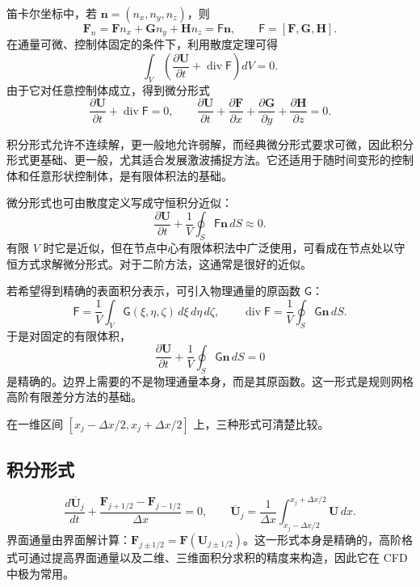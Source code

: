 \documentclass[11pt,a4paper,openany,fontset=none]{ctexbook}
\begin{document}
笛卡尔坐标中，若 $\bm n=(n_x,n_y,n_z)$，则
\begin{equation}
 \bm F_n=\bm F n_x+\bm G n_y+\bm H n_z=\boldsymbol{\mathsf F}\bm n,
 \qquad \boldsymbol{\mathsf F}=[\bm F,\bm G,\bm H]. \tag{1.14.2--3}
\end{equation}
在通量可微、控制体固定的条件下，利用散度定理可得
\begin{equation}
 \int_V\left(\frac{\partial\bm U}{\partial t}+\operatorname{div}\boldsymbol{\mathsf F}\right)dV=0.
\end{equation}
由于它对任意控制体成立，得到微分形式
\begin{equation}
 \frac{\partial\bm U}{\partial t}+\operatorname{div}\boldsymbol{\mathsf F}=0,\qquad
 \frac{\partial\bm U}{\partial t}+\frac{\partial\bm F}{\partial x}
 +\frac{\partial\bm G}{\partial y}+\frac{\partial\bm H}{\partial z}=0. \tag{1.14.6--7}
\end{equation}

积分形式允许不连续解，更一般地允许弱解，而经典微分形式要求可微，因此积分形式更基础、更一般，尤其适合发展激波捕捉方法。它还适用于随时间变形的控制体和任意形状控制体，是有限体积法的基础。

微分形式也可由散度定义写成守恒积分近似：
\begin{equation}
 \frac{\partial\bm U}{\partial t}+\frac1V\oint_S\boldsymbol{\mathsf F}\bm n\,dS\approx0. \tag{1.14.9}
\end{equation}
有限 $V$ 时它是近似，但在节点中心有限体积法中广泛使用，可看成在节点处以守恒方式求解微分形式。对于二阶方法，这通常是很好的近似。

若希望得到精确的表面积分表示，可引入物理通量的原函数 $\boldsymbol{\mathsf G}$：
\begin{equation}
 \boldsymbol{\mathsf F}=\frac1V\int_V\boldsymbol{\mathsf G}(\xi,\eta,\zeta)\,d\xi\,d\eta\,d\zeta,\qquad
 \operatorname{div}\boldsymbol{\mathsf F}=\frac1V\oint_S\boldsymbol{\mathsf G}\bm n\,dS. \tag{1.14.10--11}
\end{equation}
于是对固定的有限体积，
\begin{equation}
 \frac{\partial\bm U}{\partial t}+\frac1V\oint_S\boldsymbol{\mathsf G}\bm n\,dS=0 \tag{1.14.12}
\end{equation}
是精确的。边界上需要的不是物理通量本身，而是其原函数。这一形式是规则网格高阶有限差分方法的基础。

在一维区间 $[x_j-\Delta x/2,x_j+\Delta x/2]$ 上，三种形式可清楚比较。

\subsection*{积分形式}
\begin{equation}
 \frac{d\overline{\bm U}_j}{dt}+\frac{\bm F_{j+1/2}-\bm F_{j-1/2}}{\Delta x}=0,\qquad
 \overline{\bm U}_j=\frac1{\Delta x}\int_{x_j-\Delta x/2}^{x_j+\Delta x/2}\bm U\,dx. \tag{1.14.13--14}
\end{equation}
界面通量由界面解计算：$\bm F_{j\pm1/2}=\bm F(\bm U_{j\pm1/2})$。这一形式本身是精确的，高阶格式可通过提高界面通量以及二维、三维面积分求积的精度来构造，因此它在 CFD 中极为常用。
\end{document}
